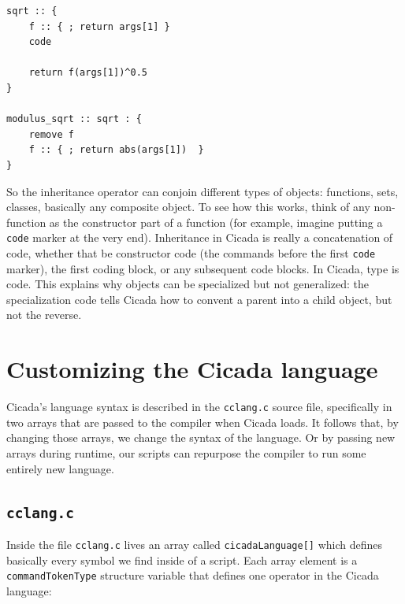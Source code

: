 \documentclass{article}
\newenvironment{code}{
       \begin{list}{}{
               \setlength{\leftmargin}{.4in}
               \setlength{\rightmargin}{0in}
               \setlength{\topsep}{.2in}
       }
       \small
       \item[] }
       { \end{list}   }
\begin{document}
\begin{code} \begin{verbatim}
sqrt :: {
    f :: { ; return args[1] }
    code

    return f(args[1])^0.5
}

modulus_sqrt :: sqrt : {
    remove f
    f :: { ; return abs(args[1])  }
}
\end{verbatim} \end{code}

\noindent So the inheritance operator can conjoin different types of objects:  functions, sets, classes, basically any composite object.  To see how this works, think of any non-function as the constructor part of a function (for example, imagine putting a \verb#code# marker at the very end).  Inheritance in Cicada is really a concatenation of code, whether that be constructor code (the commands before the first \verb#code# marker), the first coding block, or any subsequent code blocks.  In Cicada, type is code.  This explains why objects can be specialized but not generalized:  the specialization code tells Cicada how to convent a parent into a child object, but not the reverse.



\newpage








\section{Customizing the Cicada language}

Cicada's language syntax is described in the \verb#cclang.c# source file, specifically in two arrays that are passed to the compiler when Cicada loads.  It follows that, by changing those arrays, we change the syntax of the language.  Or by passing new arrays during runtime, our scripts can repurpose the compiler to run some entirely new language.



\subsection{\texttt{cclang.c}}

Inside the file \verb#cclang.c# lives an array called \verb#cicadaLanguage[]# which defines basically every symbol we find inside of a script.  Each array element is a \verb#commandTokenType# structure variable that defines one operator in the Cicada language:
\end{document}
